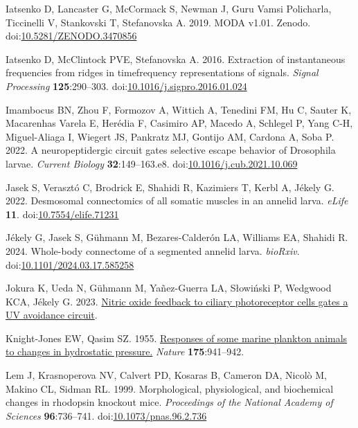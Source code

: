 \documentclass[
  11pt,
]{article}
\newlength{\cslhangindent}
\newenvironment{CSLReferences}[2] %
 {\begin{list}{}{%
  \setlength{\itemindent}{0pt}
  \setlength{\leftmargin}{0pt}
  \setlength{\parsep}{0pt}
  \ifodd #1
   \setlength{\leftmargin}{\cslhangindent}
   \setlength{\itemindent}{-1\cslhangindent}
  \fi
  \setlength{\itemsep}{#2\baselineskip}}}
 {\end{list}}
\begin{document}
\begin{CSLReferences}{1}{0}
Iatsenko D, Lancaster G, McCormack S, Newman J, Guru Vamsi Policharla,
Ticcinelli V, Stankovski T, Stefanovska A. 2019. MODA v1.01. Zenodo.
doi:\href{https://doi.org/10.5281/ZENODO.3470856}{10.5281/ZENODO.3470856}

Iatsenko D, McClintock PVE, Stefanovska A. 2016. Extraction of
instantaneous frequencies from ridges in time{\textendash}frequency
representations of signals. \emph{Signal Processing}
\textbf{125}:290--303.
doi:\href{https://doi.org/10.1016/j.sigpro.2016.01.024}{10.1016/j.sigpro.2016.01.024}

Imambocus BN, Zhou F, Formozov A, Wittich A, Tenedini FM, Hu C, Sauter
K, Macarenhas Varela E, Herédia F, Casimiro AP, Macedo A, Schlegel P,
Yang C-H, Miguel-Aliaga I, Wiegert JS, Pankratz MJ, Gontijo AM, Cardona
A, Soba P. 2022. A neuropeptidergic circuit gates selective escape
behavior of Drosophila larvae. \emph{Current Biology}
\textbf{32}:149--163.e8.
doi:\href{https://doi.org/10.1016/j.cub.2021.10.069}{10.1016/j.cub.2021.10.069}

Jasek S, Verasztó C, Brodrick E, Shahidi R, Kazimiers T, Kerbl A, Jékely
G. 2022. Desmosomal connectomics of all somatic muscles in an annelid
larva. \emph{eLife} \textbf{11}.
doi:\href{https://doi.org/10.7554/elife.71231}{10.7554/elife.71231}

Jékely G, Jasek S, Gühmann M, Bezares-Calderón LA, Williams EA, Shahidi
R. 2024. Whole-body connectome of a segmented annelid larva.
\emph{bioRxiv}.
doi:\href{https://doi.org/10.1101/2024.03.17.585258}{10.1101/2024.03.17.585258}

Jokura K, Ueda N, Gühmann M, Yañez-Guerra LA, Słowiński P, Wedgwood KCA,
Jékely G. 2023.
\href{http://dx.doi.org/10.1101/2023.08.02.551600}{Nitric oxide feedback
to ciliary photoreceptor cells gates a UV avoidance circuit}.

Knight-Jones EW, Qasim SZ. 1955.
\href{https://www.ncbi.nlm.nih.gov/pubmed/14383773}{Responses of some
marine plankton animals to changes in hydrostatic pressure.}
\emph{Nature} \textbf{175}:941--942.

Lem J, Krasnoperova NV, Calvert PD, Kosaras B, Cameron DA, Nicolò M,
Makino CL, Sidman RL. 1999. Morphological, physiological, and
biochemical changes in rhodopsin knockout mice. \emph{Proceedings of the
National Academy of Sciences} \textbf{96}:736--741.
doi:\href{https://doi.org/10.1073/pnas.96.2.736}{10.1073/pnas.96.2.736}


\end{CSLReferences}
\end{document}
